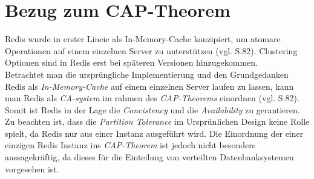 
\section{Bezug zum CAP-Theorem}
\acs{Redis} wurde in erster Lineie als In-Memory-Cache konzipiert, um atomare Operationen auf einem einzelnen Server zu unterstützen (vgl. \cite{nosql} S.82).
Clustering Optionen sind in Redis erst bei späteren Versionen hinzugekommen.
\\
Betrachtet man die ursprüngliche Implementierung und den Grundgedanken \acs{Redis} als \textit{In-Memory-Cache} auf einem einzelnen Server laufen zu lassen, kann man \acs{Redis} als \textit{CA-system} im rahmen des \textit{CAP-Theorems} einordnen (vgl. \cite{nosql} S.82).
Somit ist Redis in der Lage die \textit{Concistency} und die \textit{Availability} zu gerantieren. Zu beachten ist, dass die \textit{Partition Tolerance} im Ursprünlichen Design keine Rolle spielt, da \acs{Redis} nur aus einer Instanz ausgeführt wird. 
Die Einordnung der einer einzigen \acs{Redis} Instanz ins \textit{CAP-Theorem} ist jedoch nicht besonders aussagekräftig, da dieses für die Einteilung von verteilten Datenbanksystemen vorgesehen ist.

